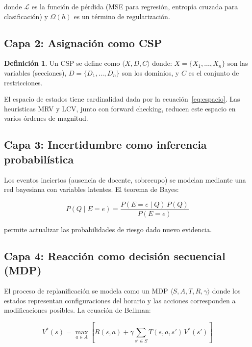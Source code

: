 \documentclass[12pt,twoside]{report}
\theoremstyle{definition}
\newtheorem{definition}{Definici\'on}[chapter]
\begin{document}
donde $\mathcal{L}$ es la funci\'on de p\'erdida (MSE para regresi\'on,
entrop\'ia cruzada para clasificaci\'on) y $\Omega(h)$ es un t\'ermino de
regularizaci\'on.

\subsection{Capa 2: Asignaci\'on como CSP}

\begin{definition}
Un CSP se define como $\langle X, D, C \rangle$ donde:
$X = \{X_1,\ldots,X_n\}$ son las variables (secciones),
$D = \{D_1,\ldots,D_n\}$ son los dominios,
y $C$ es el conjunto de restricciones.
\end{definition}

El espacio de estados tiene cardinalidad dada por la ecuaci\'on~\eqref{eq:espacio}.
Las heur\'isticas MRV y LCV, junto con forward checking, reducen este espacio
en varios \'ordenes de magnitud.

\subsection{Capa 3: Incertidumbre como inferencia probabil\'istica}

Los eventos inciertos (ausencia de docente, sobrecupo) se modelan mediante una
red bayesiana con variables latentes.  El teorema de Bayes:

\begin{equation}
  P(Q \mid E=e) = \frac{P(E=e \mid Q)\, P(Q)}{P(E=e)}
  \label{eq:bayes}
\end{equation}

permite actualizar las probabilidades de riesgo dado nuevo evidencia.

\subsection{Capa 4: Reacci\'on como decisi\'on secuencial (MDP)}

El proceso de replanificaci\'on se modela como un MDP
$\langle S, A, T, R, \gamma \rangle$ donde los estados representan
configuraciones del horario y las acciones corresponden a modificaciones
posibles.  La ecuaci\'on de Bellman:

\begin{equation}
  V^*(s) = \max_{a \in A} \left[ R(s,a) + \gamma \sum_{s' \in S} T(s,a,s')\, V^*(s') \right]
  \label{eq:bellman}
\end{equation}
\end{document}
